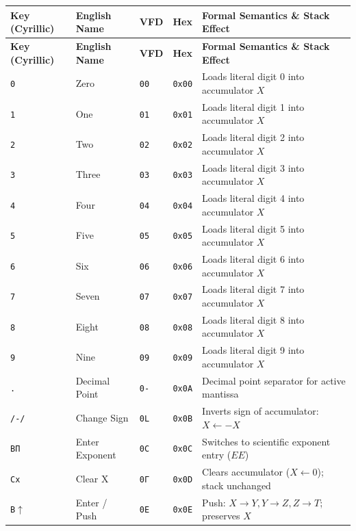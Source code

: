 \documentclass[11pt,a4paper]{article}
\begin{document}
{\small
\setlength{\tabcolsep}{4pt}
\begin{longtable}{p{2.2cm}p{3.0cm}>{\centering\arraybackslash}p{1.0cm}>{\centering\arraybackslash}p{1.2cm}p{7.3cm}}
\toprule
\textbf{Key (Cyrillic)} & \textbf{English Name} & \textbf{VFD} & \textbf{Hex} & \textbf{Formal Semantics \& Stack Effect} \\
\midrule
\endfirsthead
\toprule
\textbf{Key (Cyrillic)} & \textbf{English Name} & \textbf{VFD} & \textbf{Hex} & \textbf{Formal Semantics \& Stack Effect} \\
\midrule
\endhead
\bottomrule
\endfoot
\texttt{0} & Zero & \texttt{00} & \texttt{0x00} & Loads literal digit 0 into accumulator $X$ \\
\texttt{1} & One & \texttt{01} & \texttt{0x01} & Loads literal digit 1 into accumulator $X$ \\
\texttt{2} & Two & \texttt{02} & \texttt{0x02} & Loads literal digit 2 into accumulator $X$ \\
\texttt{3} & Three & \texttt{03} & \texttt{0x03} & Loads literal digit 3 into accumulator $X$ \\
\texttt{4} & Four & \texttt{04} & \texttt{0x04} & Loads literal digit 4 into accumulator $X$ \\
\texttt{5} & Five & \texttt{05} & \texttt{0x05} & Loads literal digit 5 into accumulator $X$ \\
\texttt{6} & Six & \texttt{06} & \texttt{0x06} & Loads literal digit 6 into accumulator $X$ \\
\texttt{7} & Seven & \texttt{07} & \texttt{0x07} & Loads literal digit 7 into accumulator $X$ \\
\texttt{8} & Eight & \texttt{08} & \texttt{0x08} & Loads literal digit 8 into accumulator $X$ \\
\texttt{9} & Nine & \texttt{09} & \texttt{0x09} & Loads literal digit 9 into accumulator $X$ \\
\texttt{.} & Decimal Point & \texttt{0-} & \texttt{0x0A} & Decimal point separator for active mantissa \\
\texttt{/-/} & Change Sign & \texttt{0L} & \texttt{0x0B} & Inverts sign of accumulator: $X \leftarrow -X$ \\
\texttt{ВП} & Enter Exponent & \texttt{0C} & \texttt{0x0C} & Switches to scientific exponent entry ($EE$) \\
\texttt{Сх} & Clear X & \texttt{0Г} & \texttt{0x0D} & Clears accumulator ($X \leftarrow 0$); stack unchanged \\
\texttt{В$\uparrow$} & Enter / Push & \texttt{0E} & \texttt{0x0E} & Push: $X \to Y, Y \to Z, Z \to T$; preserves $X$ \\

\end{longtable}}
\end{document}
